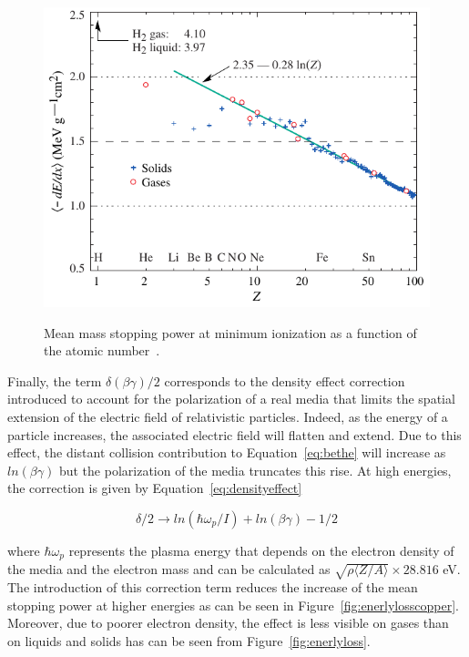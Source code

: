 	\begin{figure}[H]
		\centering
		\includegraphics[width = 0.8\plotwidth]{fig/chapt4/dedx_min_06.pdf}\\
		\caption{\label{fig:miplossrate} Mean mass stopping power at minimum ionization as a function of the atomic number~\cite{PDG2018}.}
	\end{figure}
	
	Finally, the term $\delta(\beta\gamma)/2$ corresponds to the density effect correction introduced to account for the polarization of a real media that limits the spatial extension of the electric field of relativistic particles. Indeed, as the energy of a particle increases, the associated electric field will flatten and extend. Due to this effect, the distant collision contribution to Equation~\ref{eq:bethe} will increase as $ln(\beta\gamma)$ but the polarization of the media truncates this rise. At high energies, the correction is given by Equation~\ref{eq:densityeffect}
	
	\begin{equation}
	\label{eq:densityeffect}
	\delta/2 \longrightarrow ln(\hbar\omega_p/I) + ln(\beta\gamma) - 1/2
	\end{equation}
	
	where $\hbar\omega_p$ represents the plasma energy that depends on the electron density of the media and the electron mass and can be calculated as $\sqrt{\rho\langle Z/A \rangle} \times 28.816$ \si{eV}. The introduction of this correction term reduces the increase of the mean stopping power at higher energies as can be seen in Figure~\ref{fig:enerlylosscopper}. Moreover, due to poorer electron density, the effect is less visible on gases than on liquids and solids has can be seen from Figure~\ref{fig:enerlyloss}.
	
